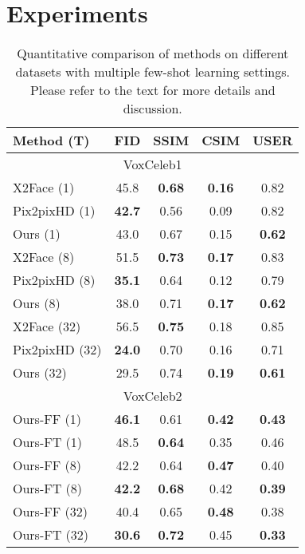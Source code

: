 \documentclass[10pt,twocolumn,letterpaper]{article}
\begin{document}
%
 \section{Experiments}

\begin{table}
    \begin{subtable}{\linewidth}
        \centering
        \begin{tabular}{ l c c c c}
            Method (T) & FID & SSIM & CSIM & USER \\
            \hline
            \multicolumn{5}{c}{VoxCeleb1}\\
            \hline
            X2Face (1)     & 45.8 & \textbf{0.68} & \textbf{0.16} & 0.82 \\
            Pix2pixHD (1)  & \textbf{42.7} & 0.56 & 0.09 & 0.82\\
            Ours  (1)      & 43.0 & 0.67 & 0.15 & \textbf{0.62}\\
            \hline
            X2Face (8)      & 51.5 & \textbf{0.73} & \textbf{0.17} & 0.83\\
            Pix2pixHD (8)   & \textbf{35.1} & 0.64 & 0.12 & 0.79\\
            Ours (8)        & 38.0 & 0.71 & \textbf{0.17} & \textbf{0.62}\\
            \hline
            X2Face (32)    & 56.5 & \textbf{0.75} & 0.18 & 0.85 \\
            Pix2pixHD (32) & \textbf{24.0} & 0.70 & 0.16 & 0.71 \\
            Ours (32)      & 29.5 & 0.74 & \textbf{0.19} & \textbf{0.61} \\
            \hline
            \multicolumn{5}{c}{VoxCeleb2} \\                                
            \hline
            Ours-FF (1)  & \textbf{46.1} & 0.61 & \textbf{0.42} & \textbf{0.43} \\
            Ours-FT (1)  & 48.5 & \textbf{0.64} & 0.35 & 0.46 \\
            \hline
            Ours-FF (8)  & 42.2 & 0.64 & \textbf{0.47} & 0.40 \\
            Ours-FT (8)  & \textbf{42.2} & \textbf{0.68} & 0.42 & \textbf{0.39} \\
            \hline
            Ours-FF (32) & 40.4 & 0.65 & \textbf{0.48} & 0.38 \\
            Ours-FT (32) & \textbf{30.6} & \textbf{0.72} & 0.45 & {\color{red}\textbf{0.33}} \\

        \end{tabular}
    \end{subtable}\vspace{-2pt}
    \caption{Quantitative comparison of methods on different datasets with multiple few-shot learning settings. Please refer to the text for more details and discussion.\vspace{-4pt}}\label{tab:maincomp}
\end{table}
\end{document}

